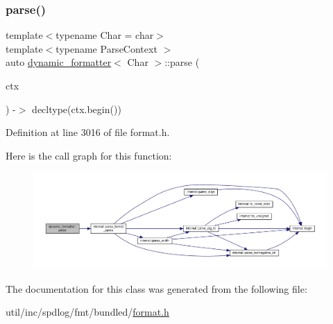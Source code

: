 \subsubsection{\texorpdfstring{parse()}{parse()}}
{\footnotesize\ttfamily template$<$typename Char  = char$>$ \\
template$<$typename Parse\+Context $>$ \\
auto \hyperlink{classdynamic__formatter}{dynamic\+\_\+formatter}$<$ Char $>$\+::parse (\begin{DoxyParamCaption}\item[{Parse\+Context \&}]{ctx }\end{DoxyParamCaption}) -\/$>$ decltype(ctx.\+begin()) \hspace{0.3cm}{\ttfamily [inline]}}



Definition at line 3016 of file format.\+h.

Here is the call graph for this function\+:
\nopagebreak
\begin{figure}[H]
\begin{center}
\leavevmode
\includegraphics[width=350pt]{classdynamic__formatter_aa9bc96ae30462d4e5f13d207f957fc0b_cgraph}
\end{center}
\end{figure}


The documentation for this class was generated from the following file\+:\begin{DoxyCompactItemize}
\item 
util/inc/spdlog/fmt/bundled/\hyperlink{format_8h}{format.\+h}\end{DoxyCompactItemize}
